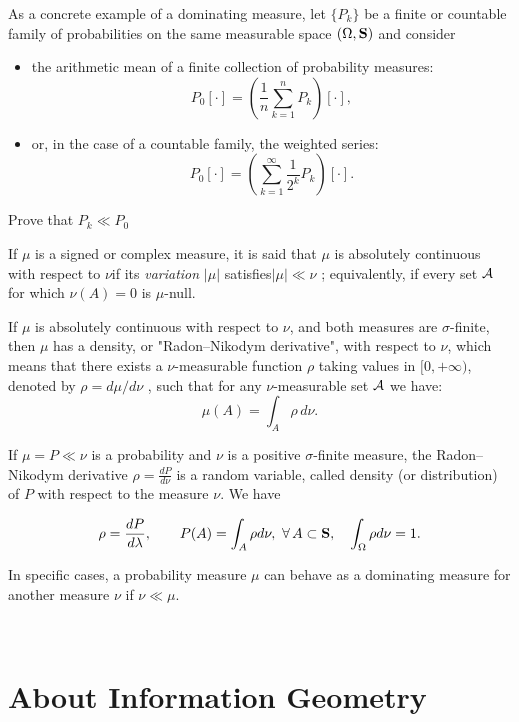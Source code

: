 {\begin{ex}\label{Ex:domMeas}
   As a concrete example of a dominating measure,  let $\{P_k\}$ be a finite or countable family of probabilities on the same measurable space $(\Omega,\mathbf{S})$ and consider
   \begin{itemize}
       \item the arithmetic mean of a finite collection of probability measures:
       \[
       P_0[\cdot] = \left(\frac{1}{n} \sum_{k=1}^n P_k\right)[\cdot],
       \]
       \item or, in the case of a countable family, the weighted series:
       \[
       P_0[\cdot] = \left(\sum_{k=1}^{\infty} \frac{1}{2^k} P_k\right)[\cdot].
       \]
   \end{itemize}
   Prove that $P_k \ll P_0$
\end{ex}

\vspace{3pt}

If $ \mu $ is a signed or complex measure, it is said that $ \mu$  is absolutely continuous with respect to 
$\nu $if its \emph{variation } $ |\mu |$ satisfies$ |\mu |\ll \nu$ ; equivalently, if every set 
$\mathcal{A}$ for which $ \nu (A)=0$ is $ \mu $-null.

\begin{theorem}
If $\mu$ is absolutely continuous with respect to $\nu$, and both measures are $\sigma$-finite, then $\mu$ has a density, or "Radon--Nikodym derivative", with respect to 
$\nu$, which means that there exists a $\nu$-measurable function 
$\rho$ taking values in $ [0,+\infty )$, denoted by $ \rho=d\mu /d\nu$ , such that for any 
$\nu$-measurable set $\mathcal{A}$ we have:
\[
 \mu (A)=\int _{A}\rho\,d\nu .
\]
\end{theorem}

If $\mu=P\ll \nu$ is a probability and $\nu$ is a positive $\sigma$-finite measure, the Radon--Nikodym derivative $\rho=\frac{dP}{d\nu}$ is a random variable, called density  (or distribution) of $P$ with respect to the measure $\nu$. We have

\[
\rho= \frac{dP}{d\lambda},\quad \quad P(A)=\int_{A}\rho d\nu,\  \forall \, A\subset \mathbf{S}, \quad \int_{\Omega}\rho d\nu=1 . 
\]


In specific cases, a probability measure  $\mu$ can behave as a dominating measure for another measure $\nu$
if $\nu \ll\mu.$ 

\, 

\section{About Information Geometry}

}
